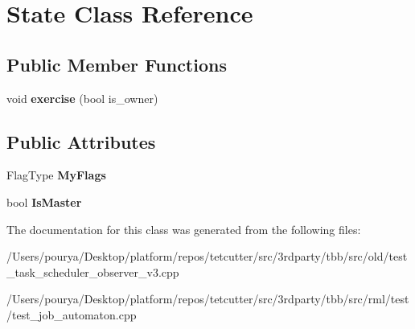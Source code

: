\hypertarget{structState}{}\section{State Class Reference}
\label{structState}
\subsection*{Public Member Functions}
\begin{DoxyCompactItemize}
\item 
\hypertarget{structState_a3fd7128b97c3fdb7de9ca262dd21b076}{}void {\bfseries exercise} (bool is\+\_\+owner)\label{structState_a3fd7128b97c3fdb7de9ca262dd21b076}

\end{DoxyCompactItemize}
\subsection*{Public Attributes}
\begin{DoxyCompactItemize}
\item 
\hypertarget{structState_a7a0ab1e5f4b21a5dbdc1045af8c89129}{}Flag\+Type {\bfseries My\+Flags}\label{structState_a7a0ab1e5f4b21a5dbdc1045af8c89129}

\item 
\hypertarget{structState_ab05b6115aece05612300d93194c97a1f}{}bool {\bfseries Is\+Master}\label{structState_ab05b6115aece05612300d93194c97a1f}

\end{DoxyCompactItemize}


The documentation for this class was generated from the following files\+:\begin{DoxyCompactItemize}
\item 
/\+Users/pourya/\+Desktop/platform/repos/tetcutter/src/3rdparty/tbb/src/old/test\+\_\+task\+\_\+scheduler\+\_\+observer\+\_\+v3.\+cpp\item 
/\+Users/pourya/\+Desktop/platform/repos/tetcutter/src/3rdparty/tbb/src/rml/test/test\+\_\+job\+\_\+automaton.\+cpp\end{DoxyCompactItemize}
